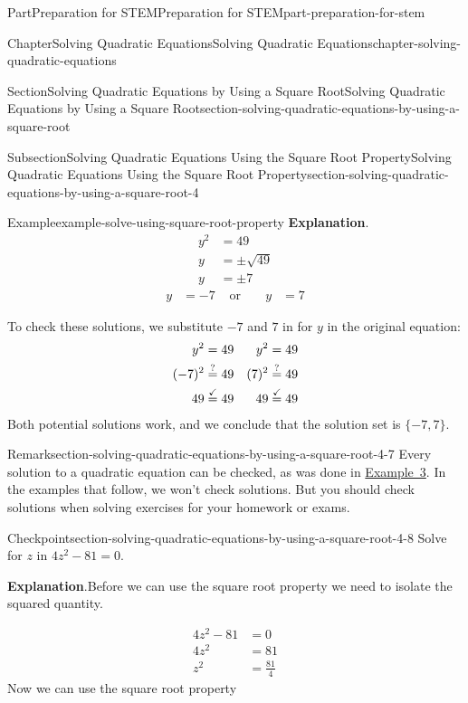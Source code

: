 \documentclass[twoside,10pt,]{book}
\newcommand{\blocktitlefont}{\relax}
\numberwithin{equation}{section}
\newcommand{\substitute}[1]{{\color{blue}{{#1}}}}
\newcommand{\confirm}[1]{\stackrel{\checkmark}{#1}}
\newcommand{\wonder}[1]{\stackrel{\text{?}}{#1}}
\newcommand{\amp}{&}
\begin{document}
\begin{partptx}{Part}{Preparation for STEM}{}{Preparation for STEM}{}{}{part-preparation-for-stem}
\begin{chapterptx}{Chapter}{Solving Quadratic Equations}{}{Solving Quadratic Equations}{}{}{chapter-solving-quadratic-equations}
\begin{sectionptx}{Section}{Solving Quadratic Equations by Using a Square Root}{}{Solving Quadratic Equations by Using a Square Root}{}{}{section-solving-quadratic-equations-by-using-a-square-root}
\begin{subsectionptx}{Subsection}{Solving Quadratic Equations Using the Square Root Property}{}{Solving Quadratic Equations Using the Square Root Property}{}{}{section-solving-quadratic-equations-by-using-a-square-root-4}
\begin{example}{Example}{}{example-solve-using-square-root-property}
{\makeatletter{}\makeatother\noindent\textbf{\blocktitlefont Explanation}.\hypertarget{example-solve-using-square-root-property-2}{}\quad{}%
\begin{align*}
y^2\amp=49\\
y\amp=\pm\sqrt{49}\\
y\amp=\pm7
\end{align*}
%
\begin{align*}
y\amp=-7\amp\text{ or }\amp\amp y\amp=7
\end{align*}
%
}\par
To check these solutions, we substitute \(-7\) and \(7\) in for \(y\) in the original equation:%
\begin{align*}
y^2\amp=49\amp y^2\amp=49\\
(\substitute{-7})^2\amp\wonder{=}49\amp (\substitute{7})^2\amp\wonder{=}49\\
49\amp\confirm{=}49\amp 49\amp\confirm{=}49
\end{align*}
Both potential solutions work, and we conclude that the solution set is \(\{-7,7\}\).%
\end{example}
\begin{remark}{Remark}{}{section-solving-quadratic-equations-by-using-a-square-root-4-7}%
Every solution to a quadratic equation can be checked, as was done in \hyperref[example-solve-using-square-root-property]{Example~3}. In the examples that follow, we won't check solutions. But you should check solutions when solving exercises for your homework or exams.%
\end{remark}
\begin{inlineexercise}{Checkpoint}{}{section-solving-quadratic-equations-by-using-a-square-root-4-8}%
Solve for \(z\) in \(4z^2-81=0\text{.}\)%
\par\smallskip%
{\makeatletter{}\makeatother\noindent\textbf{\blocktitlefont Explanation}.\hypertarget{section-solving-quadratic-equations-by-using-a-square-root-4-8-3}{}\quad{}Before we can use the square root property we need to isolate the squared quantity.%
}\par
%
\begin{equation*}
\begin{aligned}
4z^2-81\amp=0\\
4z^2\amp=81\\
z^2\amp=\frac{81}{4}
\end{aligned}
\end{equation*}
Now we can use the square root property%

\end{inlineexercise}
\end{subsectionptx}
\end{sectionptx}
\end{chapterptx}
\end{partptx}
\end{document}
